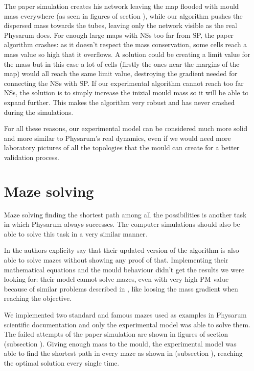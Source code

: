 \par
The paper simulation creates his network leaving the map flooded with mould mass everywhere (as seen in figures of section ), while our algorithm pushes the dispersed mass towards the tubes, leaving only the network visible as the real Physarum does. For enough large maps with NSs too far from SP, the paper algorithm crashes: as it doesn't respect the mass conservation, some cells reach a mass value so high that it overflows. A solution could be creating a limit value for the mass but in this case a lot of cells (firstly the ones near the margins of the map) would all reach the same limit value, destroying the gradient needed for connecting the NSs with SP.
If our experimental algorithm cannot reach too far NSs, the solution is to simply increase the inizial mould mass so it will be able to expand further. This makes the algorithm very robust and has never crashed during the simulations.

\par
For all these reasons, our experimental model can be considered much more solid and more similar to Physarum's real dynamics, even if we would need more laboratory pictures of all the topologies that the mould can create for a better validation process.

\section{Maze solving}

Maze solving finding the shortest path among all the possibilities is another task in which Physarum always successes. The computer simulations should also be able to solve this task in a very similar manner.

\par
In \cite{Tsompanas2016} the authors explicity say that their updated version of the algorithm is also able to solve mazes without showing any proof of that. Implementing their mathematical equations and the mould behaviour didn't get the results we were looking for: their model cannot solve mazes, even with very high PM value because of similar problems described in , like loosing the mass gradient when reaching the objective.

\par
We implemented two standard and famous mazes used as examples in Physarum scientific documentation and only the experimental model was able to solve them. The failed attempts of the paper simulation are shown in figures of section  (subsection ).
Giving enough mass to the mould, the experimental model was able to find the shortest path in every maze as shown in  (subsection ), reaching the optimal solution every single time.

